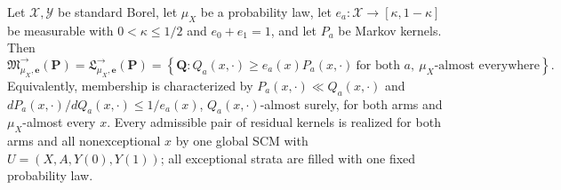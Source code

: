 Let \(\mathcal X,\mathcal Y\) be standard Borel, let \(\mu_X\) be a probability law, let \(e_a:\mathcal X\to[\kappa,1-\kappa]\) be measurable with \(0<\kappa\le1/2\) and \(e_0+e_1=1\), and let \(P_a\) be Markov kernels.  Then
\[
\mathfrak M^{\to}_{\mu_X,\boldsymbol e}(\boldsymbol P)
=\mathfrak L^{\to}_{\mu_X,\boldsymbol e}(\boldsymbol P)
=\left\{\boldsymbol Q:Q_a(x,\cdot)\ge e_a(x)P_a(x,\cdot)\ \text{for both }a,\ \mu_X\text{-almost everywhere}\right\}.
\]
Equivalently, membership is characterized by \(P_a(x,\cdot)\ll Q_a(x,\cdot)\) and \(dP_a(x,\cdot)/dQ_a(x,\cdot)\le1/e_a(x)\), \(Q_a(x,\cdot)\)-almost surely, for both arms and \(\mu_X\)-almost every \(x\).  Every admissible pair of residual kernels is realized for both arms and all nonexceptional \(x\) by one global SCM with \(U=(X,A,Y(0),Y(1))\); all exceptional strata are filled with one fixed probability law.
